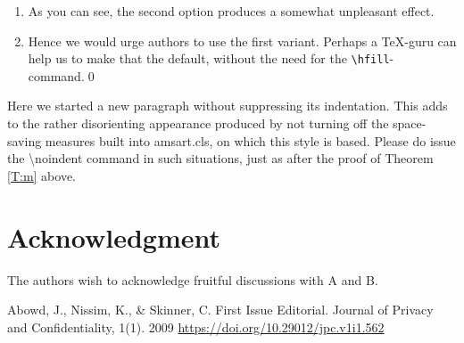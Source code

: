 \documentclass{jpc} %
\theoremstyle{plain}\newtheorem{satz}[thm]{Satz} %
\begin{document}
\proof %
\begin{enumerate}%
\item
  As you can see, the second option produces a somewhat unpleasant effect.
\item
  Hence we would urge authors to use the first variant.  Perhaps a
  \TeX-guru can help us to make that the default, without the need for
  the \texttt{\textbackslash hfill}-command.\qed
\end{enumerate}

  Here we started a new paragraph without suppressing its
  indentation.  This adds to the rather disorienting appearance
  produced by not turning off the space-saving measures built into
  amsart.cls, on which this style is based.  Please do issue the
  \hbox{\textbackslash noindent} command in such situations, just as
  after the proof of Theorem \ref{T:m} above.

\section*{Acknowledgment}
  \noindent The authors wish to acknowledge fruitful discussions with
  A and B.


\begin{thebibliography}{Abo09}

Abowd, J., Nissim, K., & Skinner, C. 
\newblock First Issue Editorial. 
\newblock Journal of Privacy and Confidentiality, 1(1). 2009 \url{https://doi.org/10.29012/jpc.v1i1.562}

\end{thebibliography}

\appendix
\end{document}
